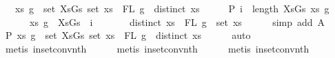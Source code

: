 \begin{isabellebody}
\ \ \ {\isachardoublequoteopen}{\isasymforall}{\isacharparenleft}{\kern0pt}xs{\isacharcomma}{\kern0pt}\ g{\isacharparenright}{\kern0pt}\ {\isasymin}\ set\ XsGs{\isachardot}{\kern0pt}\ {\isacharparenleft}{\kern0pt}set\ xs\ {\isacharequal}{\kern0pt}\ FL\ g\ {\isasymand}\ distinct\ xs{\isacharparenright}{\kern0pt}{\isachardoublequoteclose}\isanewline
%
\isadelimproof
%
\endisadelimproof
%
\isatagproof
{}\isamarkupfalse%
\ {\isacharminus}{\kern0pt}\isanewline
\ \ \isamarkupfalse%
\ P{}{\isacharcolon}{\kern0pt}\ {\isachardoublequoteopen}{\isasymforall}i\ {\isacharless}{\kern0pt}\ length\ XsGs{\isachardot}{\kern0pt}\ {\isasymforall}xs\ g{\isachardot}{\kern0pt}\ {\isacharparenleft}{\kern0pt}\isanewline
\ \ \ \ \ \ {\isacharparenleft}{\kern0pt}xs{\isacharcomma}{\kern0pt}\ g{\isacharparenright}{\kern0pt}\ {\isacharequal}{\kern0pt}\ XsGs\ {\isacharbang}{\kern0pt}\ i\ {\isacharminus}{\kern0pt}{\isacharminus}{\kern0pt}{\isachargreater}{\kern0pt}\isanewline
\ \ \ \ \ \ distinct\ xs\ {\isasymand}\ FL\ g\ {\isacharequal}{\kern0pt}\ set\ xs{\isacharparenright}{\kern0pt}{\isachardoublequoteclose}\isanewline
\ \ \ \ \isamarkupfalse%
\ {\isacharparenleft}{\kern0pt}simp\ add{\isacharcolon}{\kern0pt}\ A{}{\isacharparenright}{\kern0pt}\isanewline
\ \ \isamarkupfalse%
\ \isamarkupfalse%
\ P{}{\isacharcolon}{\kern0pt}\ {\isachardoublequoteopen}{\isasymforall}{\isacharparenleft}{\kern0pt}xs{\isacharcomma}{\kern0pt}\ g{\isacharparenright}{\kern0pt}\ {\isasymin}\ set\ XsGs{\isachardot}{\kern0pt}\ {\isacharparenleft}{\kern0pt}set\ xs\ {\isacharequal}{\kern0pt}\ FL\ g\ {\isasymand}\ distinct\ xs{\isacharparenright}{\kern0pt}{\isachardoublequoteclose}\isanewline
\ \ \ \ \isamarkupfalse%
\ auto\isanewline
\ \ \ \ \isamarkupfalse%
\ {\isacharparenleft}{\kern0pt}metis\ in{\isacharunderscore}{\kern0pt}set{\isacharunderscore}{\kern0pt}conv{\isacharunderscore}{\kern0pt}nth{\isacharparenright}{\kern0pt}\isanewline
\ \ \ \ \isamarkupfalse%
\ {\isacharparenleft}{\kern0pt}metis\ in{\isacharunderscore}{\kern0pt}set{\isacharunderscore}{\kern0pt}conv{\isacharunderscore}{\kern0pt}nth{\isacharparenright}{\kern0pt}\isanewline
\ \ \ \ \isamarkupfalse%
\ {\isacharparenleft}{\kern0pt}metis\ in{\isacharunderscore}{\kern0pt}set{\isacharunderscore}{\kern0pt}conv{\isacharunderscore}{\kern0pt}nth{\isacharparenright}{\kern0pt}\isanewline
\ \ \ \ \isamarkupfalse%

\end{isabellebody}
